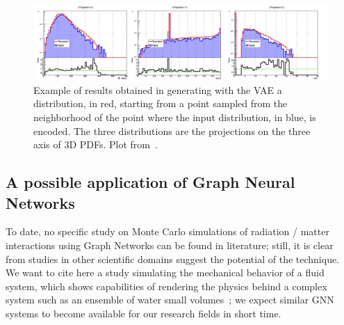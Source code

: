 
\begin{figure}[!bht]
\centering
\includegraphics [width=\textwidth]{images/generated}
\caption{Example of results obtained in generating with the VAE a distribution, in red, starting from a point sampled from the neighborhood of the point where the input distribution, in blue, is encoded. The three distributions are the projections on the three axis of 3D PDFs. Plot from~\cite{Ciardiello2020}.}
\label{fig:out}
\end{figure}



\subsection{A possible application of Graph Neural Networks}
To date, no specific study on Monte Carlo simulations of radiation / matter interactions using Graph Networks can be found in literature; still, it is clear from studies in other scientific domains suggest the potential of the technique. 
We want to cite here a study simulating the mechanical behavior of a fluid system, which shows capabilities of rendering the physics behind a complex system such as an ensemble of water small volumes~\cite{Sanchez-Gonzalez2020}; we expect similar GNN systems to become available for our research fields in short time.
